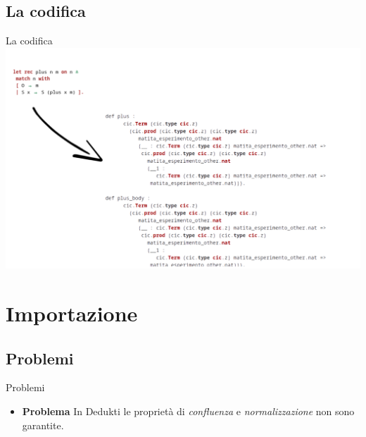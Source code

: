 \documentclass{beamer}
\begin{document}
\subsection{La codifica}
\begin{frame}{La codifica}
  \includegraphics[scale=0.30]{export.png}
\end{frame}

\section{Importazione}
\begin{frame}

\end{frame}

\subsection{Problemi}
\begin{frame}{Problemi}
\begin{itemize}
  \item \alert{\textbf{Problema}} In Dedukti le proprietà di \textit{confluenza} e 
    \textit{normalizzazione} non sono garantite.
\end{itemize}
\end{frame}
\end{document}
